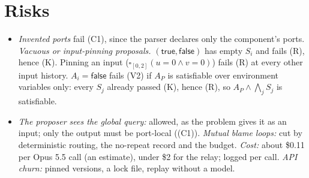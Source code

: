 \documentclass[10pt]{article}
\theoremstyle{tplain}\newtheorem{theorem}{Theorem}\newtheorem{lemma}[theorem]{Lemma}\newtheorem{proposition}[theorem]{Proposition}\newtheorem{corollary}[theorem]{Corollary}\newtheorem{claim}[theorem]{Claim}
\theoremstyle{tdef}\newtheorem{definition}[theorem]{Definition}
\newcommand{\TRUE}{\mathsf{true}}\newcommand{\FALSE}{\mathsf{false}}
\begin{document}
\section{Risks}
\begin{itemize}
\item \emph{Invented ports} fail (C1), since the parser declares only the component's ports. \emph{Vacuous or input-pinning proposals.} $(\TRUE,\FALSE)$ has empty $S_i$ and fails (R), hence (K). Pinning an input ($\square_{[0,2]}(u=0\wedge v=0)$) fails (R) at every other input history. $A_i=\FALSE$ fails (V2) if $A_P$ is satisfiable over environment variables only: every $S_j$ already passed (K), hence (R), so $A_P\wedge\bigwedge_jS_j$ is satisfiable.
\item \emph{The proposer sees the global query:} allowed, as the problem gives it as an input; only the output must be port-local ((C1)). \emph{Mutual blame loops:} cut by deterministic routing, the no-repeat record and the budget. \emph{Cost:} about \$0.11 per Opus 5.5 call (an estimate), under \$2 for the relay; logged per call. \emph{API churn:} pinned versions, a lock file, replay without a model.
\end{itemize}

\printbibliography[title={References}]
\end{document}
